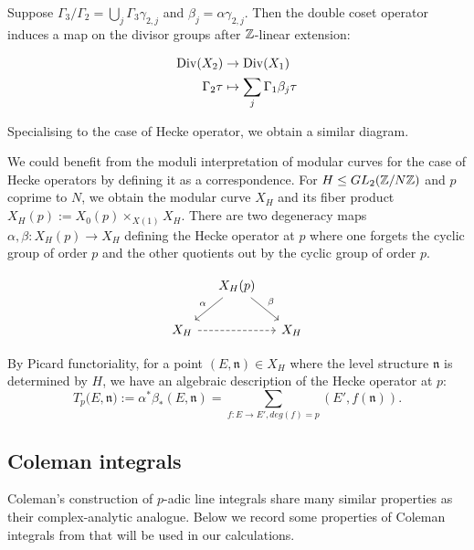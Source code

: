 Suppose $\Gamma_3 / \Gamma_2 = \bigcup_j \Gamma_3 \gamma_{2,j}$ and $\beta_j = \alpha \gamma_{2,j}$. Then the double coset operator induces a map on the divisor groups  after $\mathbb{Z}$-linear extension:

\begin{align*}
    \operatorname{Div}(X_2) &\rightarrow \operatorname{Div}(X_1) \\
    \Gamma_2 \tau &\mapsto \sum_j \Gamma_1 \beta_j \tau
\end{align*}

Specialising to the case of Hecke operator, we obtain a similar diagram. 

We could benefit from the moduli interpretation of modular curves for the case of Hecke operators by defining it as a correspondence. For $H \leq GL_2(\mathbb{Z}/N\mathbb{Z})$ and $p$ coprime to $N$, we obtain the modular curve $X_H$ and its fiber product $X_H(p) := X_0(p) \times_{X(1)} X_H$. There are two degeneracy maps $\alpha,\beta: X_H(p) \rightarrow X_H$ defining the Hecke operator at $p$ where one forgets the cyclic group of order $p$ and the other quotients out by the cyclic group of order $p$.


\[
\begin{tikzcd}[column sep=small]
 & X_H(p) \arrow{dl}[swap]{\alpha} \arrow{dr}{\beta} & \\
X_H \arrow[rr,dashed] & & X_H
\end{tikzcd}
\]

By Picard functoriality, for a point $(E,\mathfrak{n}) \in X_H$ where the level structure $\mathfrak{n}$ is determined by $H$, we have an algebraic description of the Hecke operator at $p$: \[T_p(E,\mathfrak{n)} := \alpha^* \beta_* (E,\mathfrak{n}) = \sum_{f:E\rightarrow E', deg(f) = p} (E',f(\mathfrak{n})).\]


\subsection{Coleman integrals}\label{sec:coleman_integration}

Coleman's construction of $p$-adic line integrals share many similar properties as their complex-analytic analogue. Below we record some properties of Coleman integrals from \cite{Coleman1,coleman85} that will be used in our calculations.

